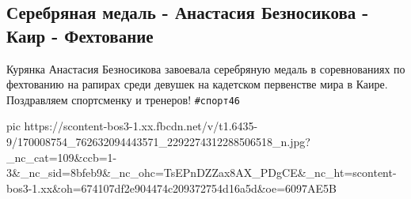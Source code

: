  
 
 
 
 

\subsection{Серебряная медаль - Анастасия Безносикова - Каир - Фехтование}
\label{sec:07_04_2021.fb.kursk2032.1.sport_fehtovanie_beznosikova_anastasia_pobeda}

Курянка Анастасия Безносикова завоевала серебряную медаль в соревнованиях по
фехтованию на рапирах среди девушек на кадетском первенстве мира в Каире.
Поздравляем спортсменку и тренеров! \verb|#спорт46|

\ifcmt
  pic https://scontent-bos3-1.xx.fbcdn.net/v/t1.6435-9/170008754_762632094443571_2292274312288506518_n.jpg?_nc_cat=109&ccb=1-3&_nc_sid=8bfeb9&_nc_ohc=TsEPnDZZax8AX_PDgCE&_nc_ht=scontent-bos3-1.xx&oh=674107df2e904474c209372754d16a5d&oe=6097AE5B
\fi

